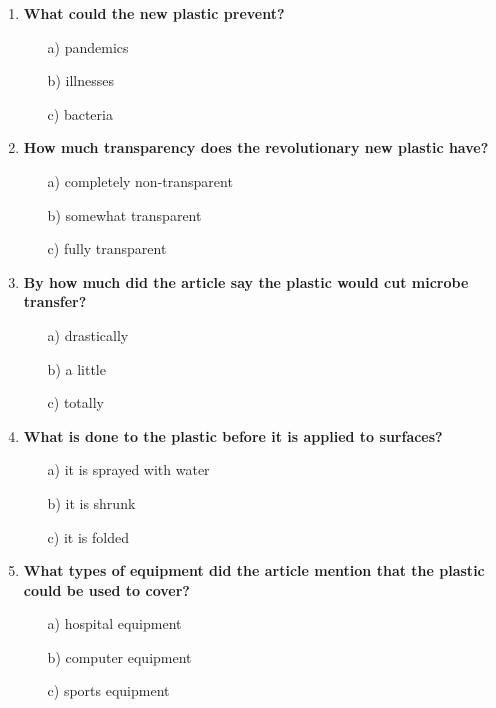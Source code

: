 \begin{enumerate}
      \item \textbf{What could the new plastic prevent?}
            \begin{enumerate}
                  \item[a)] pandemics
                  \item[b)] illnesses
                  \item[c)] bacteria
            \end{enumerate}
      \item \textbf{How much transparency does the revolutionary new plastic have?}
            \begin{enumerate}
                  \item[a)] completely non-transparent
                  \item[b)] somewhat transparent
                  \item[c)] fully transparent
            \end{enumerate}
      \item \textbf{By how much did the article say the plastic would cut microbe transfer?}
            \begin{enumerate}
                  \item[a)] drastically
                  \item[b)] a little
                  \item[c)] totally
            \end{enumerate}
      \item \textbf{What is done to the plastic before it is applied to surfaces?}
            \begin{enumerate}
                  \item[a)] it is sprayed with water
                  \item[b)] it is shrunk
                  \item[c)] it is folded
            \end{enumerate}
      \item \textbf{What types of equipment did the article mention that the plastic could be used to cover?}
            \begin{enumerate}
                  \item[a)] hospital equipment
                  \item[b)] computer equipment
                  \item[c)] sports equipment
            \end{enumerate}

\end{enumerate}
